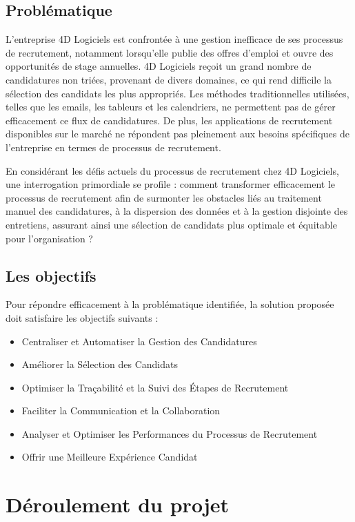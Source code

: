 \subsection{Problématique}
L'entreprise 4D Logiciels est confrontée à une gestion inefficace
 de ses processus de recrutement, notamment lorsqu'elle publie 
 des offres d'emploi et ouvre des opportunités de stage annuelles.
4D Logiciels reçoit un grand nombre de candidatures non triées,
provenant de divers domaines, ce qui rend difficile la
sélection des candidats les plus appropriés. Les méthodes 
traditionnelles utilisées, telles que les emails, les tableurs 
et les calendriers, ne permettent pas de gérer efficacement 
ce flux de candidatures. De plus, les applications de recrutement
 disponibles sur le marché ne répondent pas pleinement aux 
 besoins spécifiques de l'entreprise en termes de processus 
 de recrutement.

En considérant les défis actuels du processus de recrutement chez
 4D Logiciels, une interrogation primordiale se profile : 
 comment transformer efficacement le processus de recrutement 
 afin de surmonter les obstacles liés au traitement manuel des 
 candidatures, à la dispersion des données et à la gestion 
 disjointe des entretiens, assurant ainsi une sélection de 
 candidats plus optimale et équitable pour l'organisation ?


\subsection{Les objectifs}

Pour répondre efficacement à la problématique identifiée,
la solution proposée doit satisfaire les objectifs suivants :

\begin{itemize}
    \item Centraliser et Automatiser la Gestion des Candidatures
    \item Améliorer la Sélection des Candidats 
    \item Optimiser la Traçabilité et la Suivi des Étapes de Recrutement 
    \item Faciliter la Communication et la Collaboration 
    \item Analyser et Optimiser les Performances du Processus de Recrutement 
    \item Offrir une Meilleure Expérience Candidat 
\end{itemize}

\section{Déroulement du projet}




